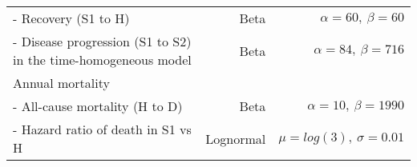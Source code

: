 \documentclass[
]{article}
\begin{document}
\begin{longtable}[]{@{}lrr@{}}
\begin{minipage}[t]{0.32\columnwidth}\raggedright
- Recovery (S1 to H)\strut
\end{minipage} & \begin{minipage}[t]{0.17\columnwidth}\raggedleft
Beta\strut
\end{minipage} & \begin{minipage}[t]{0.42\columnwidth}\raggedleft
\(\alpha=60, \ \beta=60\)\strut
\end{minipage}\tabularnewline
\begin{minipage}[t]{0.32\columnwidth}\raggedright
- Disease progression (S1 to S2) in the time-homogeneous model\strut
\end{minipage} & \begin{minipage}[t]{0.17\columnwidth}\raggedleft
Beta\strut
\end{minipage} & \begin{minipage}[t]{0.42\columnwidth}\raggedleft
\(\alpha=84, \ \beta=716\)\strut
\end{minipage}\tabularnewline
\begin{minipage}[t]{0.32\columnwidth}\raggedright
Annual mortality\strut
\end{minipage} & \begin{minipage}[t]{0.17\columnwidth}\raggedleft
\strut
\end{minipage} & \begin{minipage}[t]{0.42\columnwidth}\raggedleft
\strut
\end{minipage}\tabularnewline
\begin{minipage}[t]{0.32\columnwidth}\raggedright
- All-cause mortality (H to D)\strut
\end{minipage} & \begin{minipage}[t]{0.17\columnwidth}\raggedleft
Beta\strut
\end{minipage} & \begin{minipage}[t]{0.42\columnwidth}\raggedleft
\(\alpha=10, \ \beta=1990\)\strut
\end{minipage}\tabularnewline
\begin{minipage}[t]{0.32\columnwidth}\raggedright
- Hazard ratio of death in S1 vs H\strut
\end{minipage} & \begin{minipage}[t]{0.17\columnwidth}\raggedleft
Lognormal\strut
\end{minipage} & \begin{minipage}[t]{0.42\columnwidth}\raggedleft
\(\mu = log(3), \ \sigma = 0.01\)\strut
\end{minipage}\tabularnewline

\end{longtable}
\end{document}
